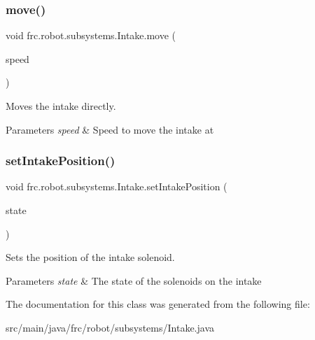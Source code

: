 \subsubsection{\texorpdfstring{move()}{move()}}
{\footnotesize\ttfamily void frc.\+robot.\+subsystems.\+Intake.\+move (\begin{DoxyParamCaption}\item[{double}]{speed }\end{DoxyParamCaption})\hspace{0.3cm}{\ttfamily [inline]}}



Moves the intake directly. 


\begin{DoxyParams}{Parameters}
{\em speed} & Speed to move the intake at \\
\hline
\end{DoxyParams}
\mbox{\label{classfrc_1_1robot_1_1subsystems_1_1_intake_af3858233c58370b640d5a4d2871d72dd}} 
\subsubsection{\texorpdfstring{setIntakePosition()}{setIntakePosition()}}
{\footnotesize\ttfamily void frc.\+robot.\+subsystems.\+Intake.\+set\+Intake\+Position (\begin{DoxyParamCaption}\item[{\mbox{\hyperlink{enumfrc_1_1robot_1_1enums_1_1_solenoid_state}{Solenoid\+State}}}]{state }\end{DoxyParamCaption})\hspace{0.3cm}{\ttfamily [inline]}}



Sets the position of the intake solenoid. 


\begin{DoxyParams}{Parameters}
{\em state} & The state of the solenoids on the intake \\
\hline
\end{DoxyParams}


The documentation for this class was generated from the following file\+:\begin{DoxyCompactItemize}
\item 
src/main/java/frc/robot/subsystems/Intake.\+java\end{DoxyCompactItemize}

